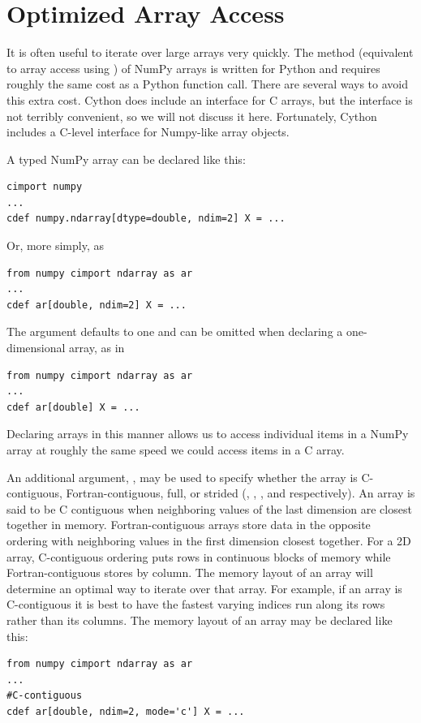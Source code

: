\section*{Optimized Array Access}
It is often useful to iterate over large arrays very quickly.
The  method (equivalent to array access using \li{[ ]}) of NumPy arrays is written for Python and requires roughly the same cost as a Python function call.
There are several ways to avoid this extra cost.
Cython does include an interface for C arrays, but the interface is not terribly convenient, so we will not discuss it here.
Fortunately, Cython includes a C-level interface for Numpy-like array objects.

A typed NumPy array can be declared like this:
\begin{lstlisting}
cimport numpy
...
cdef numpy.ndarray[dtype=double, ndim=2] X = ...
\end{lstlisting}
Or, more simply, as
\begin{lstlisting}
from numpy cimport ndarray as ar
...
cdef ar[double, ndim=2] X = ...
\end{lstlisting}
The  argument defaults to one and can be omitted when declaring a one-dimensional array, as in
\begin{lstlisting}
from numpy cimport ndarray as ar
...
cdef ar[double] X = ...
\end{lstlisting}
Declaring arrays in this manner allows us to access individual items in a NumPy array at roughly the same speed we could access items in a C array.

An additional argument, , may be used to specify whether the array is C-contiguous, Fortran-contiguous, full, or strided (, , , and  respectively).
An array is said to be C contiguous when neighboring values of the last dimension are closest together in memory.
Fortran-contiguous arrays store data in the opposite ordering with neighboring values in the first dimension closest together.
For a 2D array, C-contiguous ordering puts rows in continuous blocks of memory while Fortran-contiguous stores by column.
The memory layout of an array will determine an optimal way to iterate over that array.
For example, if an array is C-contiguous it is best to have the fastest varying indices run along its rows rather than its columns.
The memory layout of an array may be declared like this:
\begin{lstlisting}
from numpy cimport ndarray as ar
...
#C-contiguous
cdef ar[double, ndim=2, mode='c'] X = ...
\end{lstlisting}

